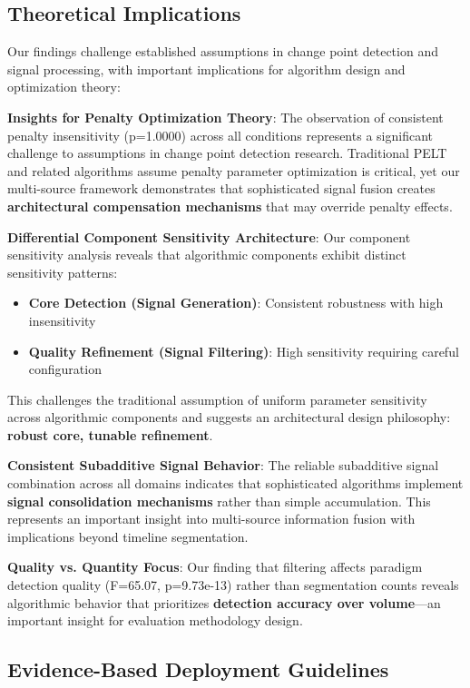 \documentclass[conference]{IEEEtran}
\begin{document}
\subsection{Theoretical Implications}

Our findings challenge established assumptions in change point detection and signal processing, with important implications for algorithm design and optimization theory:

\textbf{Insights for Penalty Optimization Theory}: The observation of consistent penalty insensitivity (p=1.0000) across all conditions represents a significant challenge to assumptions in change point detection research. Traditional PELT and related algorithms assume penalty parameter optimization is critical, yet our multi-source framework demonstrates that sophisticated signal fusion creates \textbf{architectural compensation mechanisms} that may override penalty effects.

\textbf{Differential Component Sensitivity Architecture}: Our component sensitivity analysis reveals that algorithmic components exhibit distinct sensitivity patterns:
\begin{itemize}
\item \textbf{Core Detection (Signal Generation)}: Consistent robustness with high insensitivity
\item \textbf{Quality Refinement (Signal Filtering)}: High sensitivity requiring careful configuration
\end{itemize}

This challenges the traditional assumption of uniform parameter sensitivity across algorithmic components and suggests an architectural design philosophy: \textbf{robust core, tunable refinement}.

\textbf{Consistent Subadditive Signal Behavior}: The reliable subadditive signal combination across all domains indicates that sophisticated algorithms implement \textbf{signal consolidation mechanisms} rather than simple accumulation. This represents an important insight into multi-source information fusion with implications beyond timeline segmentation.

\textbf{Quality vs. Quantity Focus}: Our finding that filtering affects paradigm detection quality (F=65.07, p=9.73e-13) rather than segmentation counts reveals algorithmic behavior that prioritizes \textbf{detection accuracy over volume}—an important insight for evaluation methodology design.

\subsection{Evidence-Based Deployment Guidelines}
\end{document}

